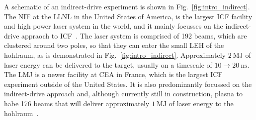 A schematic of an indirect-drive experiment is shown in Fig.~\ref{fig:intro_indirect}.
The \ac{NIF} at the \ac{LLNL} in the United States of America, is the largest \ac{ICF} facility and high power laser system in the world, and it mainly focusses on the indirect-drive appraoch to \ac{ICF}~\cite{miller_national_2004,spaeth_description_2016}.
The laser system is comprised of 192 beams, which are clustered around two poles, so that they can enter the small \ac{LEH} of the hohlraum, as is demonstrated in Fig.~\ref{fig:intro_indirect}.
Approximately $2\ \text{MJ}$ of laser energy can be delivered to the target, usually on a timescale of $10\rightarrow20\ \text{ns}$.
The \ac{LMJ} is a newer facility at \ac{CEA} in France, which is the largest \ac{ICF} experiment outside of the United States.
It is also predominantly focussed on the indirect-drive approach and, although currently still in construction, plasna to habe 176 beams that will deliver approximately $1\ \text{MJ}$ of laser energy to the hohlraum~\cite{fleurot_laser_2005}.

